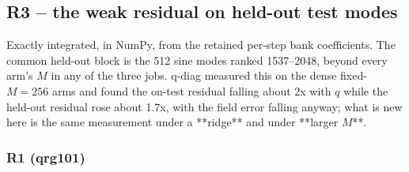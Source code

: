 \documentclass[11pt]{article}
\begin{document}
\subsection{R3 -- the weak residual on held-out test modes}
Exactly integrated, in NumPy, from the retained per-step bank coefficients. The common held-out block is the 512 sine modes ranked 1537–2048, beyond every arm's $M$ in any of the three jobs. q-diag measured this on the dense fixed-$M=256$ arms and found the on-test residual falling about 2x with $q$ while the held-out residual rose about 1.7x, with the field error falling anyway; what is new here is the same measurement under a **ridge** and under **larger $M$**.

\subsubsection{R1 (qrg101)}
\end{document}

